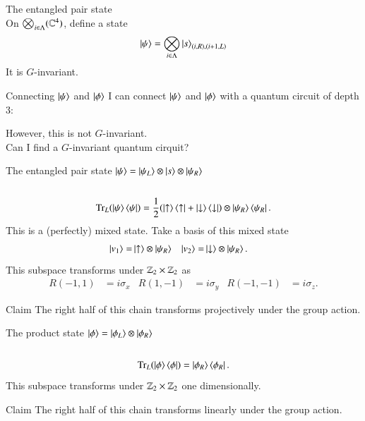 \documentclass{beamer}
\begin{document}
\begin{frame}{The entangled pair state}
	\\
	On $\bigotimes_{i\in\Lambda}(\mathbb{C}^4)$, define a state
	\begin{equation*}
		\ket{\psi}=\bigotimes_{i\in\Lambda}\ket{s}_{(i,R),(i+1,L)}
	\end{equation*}
	\pause
	It is $G$-invariant.
\end{frame}


\begin{frame}{Connecting $\ket{\psi}$ and $\ket{\phi}$}
	I can connect $\ket{\psi}$ and $\ket{\phi}$ with a quantum circuit of depth 3:
	\begin{center}
		\scalebox{0.75}{
		
		}
	\end{center}
	\pause
	However, this is not $G$-invariant.\\
	\pause
	Can I find a $G$-invariant quantum cirquit?
\end{frame}

\begin{frame}{The entangled pair state}
	$\ket{\psi}=\ket{\psi_L}\otimes\ket{s}\otimes\ket{\psi_R}$ \\
	\\
	\pause
	\begin{equation*}
		\textrm{Tr}_L(\ket{\psi}\bra{\psi})=\frac{1}{2}(\ket{\uparrow}\bra{\uparrow}+\ket{\downarrow}\bra{\downarrow})\otimes\ket{\psi_R}\bra{\psi_R}.
	\end{equation*}
	This is a (perfectly) mixed state. Take a basis of this mixed state
	\begin{align*}
		\ket{v_1}=&\ket{\uparrow}\otimes\ket{\psi_R}&\ket{v_2}=&\ket{\downarrow}\otimes\ket{\psi_R}.
	\end{align*}
	\pause
	This subspace transforms under $\mathbb{Z}_2\times\mathbb{Z}_2$ as
	\begin{align*}
		R(-1,1)&=i\sigma_x&R(1,-1)&=i\sigma_y&R(-1,-1)&=i\sigma_z.
	\end{align*}
	\begin{block}{Claim}
		The right half of this chain transforms projectively under the group action.
	\end{block}
\end{frame}

\begin{frame}{The product state}
	$\ket{\phi}=\ket{\phi_{L}}\otimes\ket{\phi_{R}}$ \\
	\\
	\pause
	\begin{equation*}
		\textrm{Tr}_L(\ket{\phi}\bra{\phi})=\ket{\phi_{R}}\bra{\phi_{R}}.
	\end{equation*}
	\pause
	This subspace transforms under $\mathbb{Z}_2\times\mathbb{Z}_2$ one dimensionally.
	\begin{block}{Claim}
		The right half of this chain transforms linearly under the group action.
	\end{block}
\end{frame}
\end{document}
